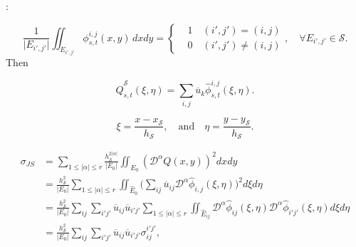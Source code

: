 \documentclass[usenames,dvipsnames,letterpaper,landscape,final]{slides}
\begin{document}
\begin{myslide}

:

\begin{equation*}\label{eq:basispoly}
		  \frac{1}{\lvert E_{i',j'}\rvert } \iint_{E_{i',j'}} \phi^{i,j}_{s,t} (x,y)\, dxdy = 
		  \left \{
					 \begin{aligned}
								&1 \quad  (i',j') = (i,j)\\
								&0 \quad  (i',j') \neq (i,j)
					 \end{aligned}
					 \right. 
					 ,\quad \forall E_{i',j'} \in \mathcal{S}.
\end{equation*}
Then
		  \parbox{0.6\textwidth}{\raggedright
\begin{equation*}\label{eq:normalizedstencilpoly}
		  \hat{Q}^{\mathcal{S}}_{s,t}(\xi, \eta) = \sum_{i,j} \overline{u}_k \hat{\phi}_{s,t}^{i,j}(\xi, \eta).
\end{equation*}
		  }\parbox{0.4\textwidth}{\raggedright
\begin{equation*}
\xi = \frac{x-x_\mathcal{S}}{h_\mathcal{S}},\quad \text{and} \quad \eta = \frac{y-y_\mathcal{S}}{h_\mathcal{S}}.
\end{equation*}
		  }

\begin{equation*}\label{eq:JSsmoothnessIC}
\begin{aligned}
		  \sigma_{JS} &= \sum_{1\leq \lvert \alpha \rvert \leq r}  \frac{h_\mathcal{S}^{2\lvert\alpha\rvert}}{\lvert E_0 \rvert} 
		  \iint_{E_0} (\mathcal{D}^\alpha Q(x,y))^2 dx dy\\
					  &= \frac{h_\mathcal{S}^2}{\lvert E_0 \rvert}\sum_{1\leq \lvert \alpha \rvert \leq r} \iint_{\hat{E}_0} \big( \sum_{ij} \overline{u}_{ij} \mathcal{D}^\alpha \hat{\phi}_{i,j}(\xi, \eta) \big)^2 d\xi d\eta \\
					  &= \frac{h_\mathcal{S}^2}{\lvert E_0 \rvert}\sum_{ij} \sum_{i'j'} \overline{u}_{ij} \overline{u}_{i'j'} \sum_{1\leq \lvert \alpha \rvert \leq r} 
					  \iint_{\hat{E}_{ij}} \mathcal{D}^\alpha \hat{\phi}_{ij}(\xi, \eta) 
					  \mathcal{D}^\alpha \hat{\phi}_{i'j'}(\xi, \eta) d\xi d\eta \\
					  &= \frac{h_\mathcal{S}^2}{\lvert E_0 \rvert}\sum_{ij} \sum_{i'j'} \overline{u}_{ij} \overline{u}_{i'j'} \sigma^{i'j'}_{ij},
\end{aligned}
\end{equation*}

\end{myslide}
\end{document}
